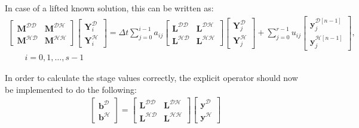 In case of a lifted known solution, this can be written as:
\begin{align*}
\left[ \begin{array}{cc}
\boldsymbol{M}^{\mathcal{DD}} & \boldsymbol{M}^{\mathcal{DH}} \\
\boldsymbol{M}^{\mathcal{HD}} & \boldsymbol{M}^{\mathcal{HH}} \end{array} \right]
\left[ \begin{array}{c}
\boldsymbol{Y}^{\mathcal{D}}_i \\
\boldsymbol{Y}^{\mathcal{H}}_i \end{array} \right]
= \Delta t\sum_{j=0}^{i-1}a_{ij}
\left[ \begin{array}{cc}
\boldsymbol{L}^{\mathcal{DD}} & \boldsymbol{L}^{\mathcal{DH}} \\
\boldsymbol{L}^{\mathcal{HD}} & \boldsymbol{L}^{\mathcal{HH}} \end{array} \right]
\left[ \begin{array}{c}
\boldsymbol{Y}^{\mathcal{D}}_j \\
\boldsymbol{Y}^{\mathcal{H}}_j \end{array} \right]
+\sum_{j=0}^{r-1}u_{ij}
\left[ \begin{array}{c}
\boldsymbol{y}^{\mathcal{D}[n-1]}_j \\
\boldsymbol{y}^{\mathcal{H}[n-1]}_j \end{array} \right],\\
\qquad i=0,1,\ldots,s-1
\end{align*}
 
In order to calculate the stage values correctly, the explicit operator
should now be implemented to do the following:
\begin{align*}
\left[ \begin{array}{c}
\boldsymbol{b}^{\mathcal{D}} \\
\boldsymbol{b}^{\mathcal{H}} \end{array} \right]
=
\left[ \begin{array}{cc}
\boldsymbol{L}^{\mathcal{DD}} & \boldsymbol{L}^{\mathcal{DH}} \\
\boldsymbol{L}^{\mathcal{HD}} & \boldsymbol{L}^{\mathcal{HH}} \end{array} \right]
\left[ \begin{array}{c}
\boldsymbol{y}^{\mathcal{D}} \\
\boldsymbol{y}^{\mathcal{H}} \end{array} \right]
\end{align*}
    
